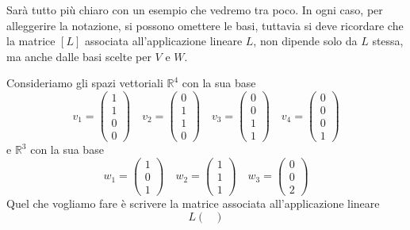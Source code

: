 Sar\`a tutto pi\`u chiaro con un esempio che vedremo tra poco. In ogni caso, per
alleggerire la notazione, si possono omettere le basi, tuttavia si deve ricordare che
la matrice $[L]$ associata all'applicazione lineare $L$, non dipende solo da $L$ stessa,
ma anche dalle basi scelte per $V$ e $W$.

\begin{example}
	Consideriamo gli spazi vettoriali $\mathbb{R}^4$ con la sua base
	\begin{equation*}
		v_1 = \begin{pmatrix}
			1 \\ 1 \\ 0 \\ 0
		\end{pmatrix} \quad
		v_2 = \begin{pmatrix}
			0 \\ 1 \\ 1 \\ 0
		\end{pmatrix} \quad
		v_3 = \begin{pmatrix}
			0 \\ 0 \\ 1 \\ 1
		\end{pmatrix} \quad
		v_4 = \begin{pmatrix}
			0 \\ 0 \\ 0 \\ 1
		\end{pmatrix}
	\end{equation*}
	e $\mathbb{R}^3$ con la sua base
	\begin{equation*}
		w_1 = \begin{pmatrix}
			1 \\ 0 \\ 1
		\end{pmatrix} \quad
		w_2 = \begin{pmatrix}
			1 \\ 1 \\ 1
		\end{pmatrix} \quad
		w_3 = \begin{pmatrix}
			0 \\ 0 \\ 2
		\end{pmatrix}
	\end{equation*}
	Quel che vogliamo fare \`e scrivere la matrice associata all'applicazione lineare
	\begin{equation*}
		L \begin{pmatrix}

\end{pmatrix}
\end{equation*}
\end{example}

